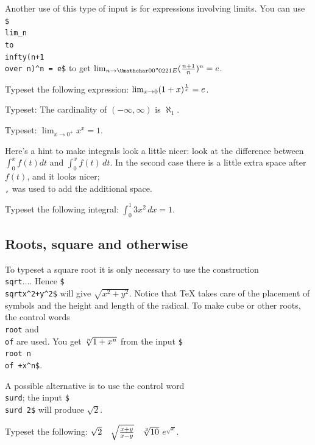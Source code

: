 Another use of this type of input is for expressions 
involving limits.  You can use 
{\tt \$\\lim\_\lb n\\to \\infty\rb (\lb n+1 \\over n\rb)\^{}n = e\$} 
to get $\lim_{n\to \infty} ({n+1\over n})^n = e$. 

\exercise Typeset the following expression: $\lim_{x\to 0} 
(1+x)^{1\over x}=e$. 

\exercise Typeset: The cardinality of $(-\infty, \infty)$ is $\aleph_1$. 

\exercise Typeset: $\lim_{x\to {0^+}} x^x = 1$. 
\bigskip 

Here's a hint to make integrals look a little nicer: look at the 
difference between $\int_0^x f(t) dt$ and $\int_0^x f(t)\, dt$\null. 
In the second case there is a little extra space after 
$f(t)$, and it looks nicer; {\tt \\,} was used to add the 
additional space. 
\toindex{,} 

\exercise Typeset the following integral: $\int_0^1 3x^2\,dx = 1$. 

\subsection{Roots, square and otherwise} 

To typeset a square root it is only necessary to use the construction 
{\tt \\sqrt\lb$\ldots$\rb}\null. Hence {\tt \$\\sqrt\lb x\^{}2+y\^{}2\rb\$} 
will give $\sqrt{x^2+y^2}$\null.  Notice that \TeX{} takes care of the 
placement of symbols and the height and length of the radical. 
To make cube or other roots, the control words {\tt \\root} and {\tt 
\\of} are used.  You get $\root n \of {1+x^n}$ from the 
input {\tt \$\\root n \\of {}+x\^{}n\rb\$}. 

A possible alternative is to use the control word {\tt \\surd}; the 
input {\tt \$\\surd 2\$} will produce $\surd 2$. 

\exercise Typeset the following: $\sqrt2 \quad \sqrt {x+y\over x-y} 
\quad \root 3 \of {10}$ \quad $e^{\sqrt x}$. 

